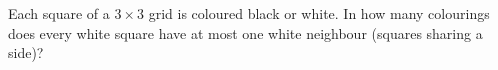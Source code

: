 Each square of a $3\times3$ grid is coloured black or white. In how many colourings does every white square have at most one white neighbour (squares sharing a side)?
